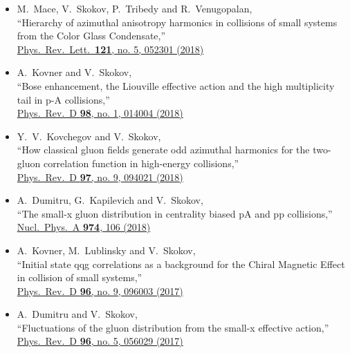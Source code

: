 \begin{itemize}
	\setlength\itemsep{0.25em}	
	\item[]  
		M.~Mace, V.~Skokov, P.~Tribedy and R.~Venugopalan, \\
  ``Hierarchy of azimuthal anisotropy harmonics in collisions of small systems from the Color Glass Condensate,'' \\
  \href{http://dx.doi.org/10.1103/PhysRevLett.121.052301}{
	  Phys.\ Rev.\ Lett.\  {\bf 121}, no. 5, 052301 (2018)}
	
	\item[]   
		A.~Kovner and V.~Skokov, \\
  ``Bose enhancement, the Liouville effective action and the high multiplicity tail in p-A collisions,'' \\
  \href{http://dx.doi.org/10.1103/PhysRevD.98.014004}{ 
  Phys.\ Rev.\ D {\bf 98}, no. 1, 014004 (2018)}

	\item[]   
		Y.~V.~Kovchegov and V.~Skokov, \\
  ``How classical gluon fields generate odd azimuthal harmonics for the two-gluon correlation function in high-energy collisions,'' \\
  \href{http://dx.doi.org/doi:10.1103/PhysRevD.97.094021}  {
	  Phys.\ Rev.\ D {\bf 97}, no. 9, 094021 (2018) }

	\item[]  
		A.~Dumitru, G.~Kapilevich and V.~Skokov,\\
  ``The small-x gluon distribution in centrality biased pA and pp collisions,''\\
  \href{http://dx.doi.org/doi:10.1016/j.nuclphysa.2018.03.012}{
	  Nucl.\ Phys.\ A {\bf 974}, 106 (2018)}


	\item[] 
		A.~Kovner, M.~Lublinsky and V.~Skokov,\\
  ``Initial state qqg correlations as a background for the Chiral Magnetic Effect in collision of small systems,''\\
  \href{http://dx.doi.org/doi:10.1103/PhysRevD.96.096003}{
	  Phys.\ Rev.\ D {\bf 96}, no. 9, 096003 (2017)}

  \item[] 
	  A.~Dumitru and V.~Skokov,\\
  ``Fluctuations of the gluon distribution from the small-x effective action,''\\
   \href{http://dx.doi.org/doi:10.1103/PhysRevD.96.056029}{
  Phys.\ Rev.\ D {\bf 96}, no. 5, 056029 (2017)
}


\end{itemize}
